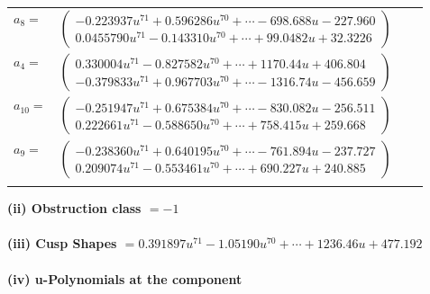 \documentclass[1p]{elsarticle_modified}
\theoremstyle{definition}
\begin{document}
\begin{tabular}{m{7pt} m{180pt} m{7pt} m{180pt} }
\flushright $a_{8}=$&$\begin{pmatrix}-0.223937 u^{71}+0.596286 u^{70}+\cdots-698.688 u-227.960\\0.0455790 u^{71}-0.143310 u^{70}+\cdots+99.0482 u+32.3226\end{pmatrix}$ \\
\flushright $a_{4}=$&$\begin{pmatrix}0.330004 u^{71}-0.827582 u^{70}+\cdots+1170.44 u+406.804\\-0.379833 u^{71}+0.967703 u^{70}+\cdots-1316.74 u-456.659\end{pmatrix}$ \\
\flushright $a_{10}=$&$\begin{pmatrix}-0.251947 u^{71}+0.675384 u^{70}+\cdots-830.082 u-256.511\\0.222661 u^{71}-0.588650 u^{70}+\cdots+758.415 u+259.668\end{pmatrix}$ \\
\flushright $a_{9}=$&$\begin{pmatrix}-0.238360 u^{71}+0.640195 u^{70}+\cdots-761.894 u-237.727\\0.209074 u^{71}-0.553461 u^{70}+\cdots+690.227 u+240.885\end{pmatrix}$\\&\end{tabular}
\flushleft \textbf{(ii) Obstruction class $= -1$}\\~\\
\flushleft \textbf{(iii) Cusp Shapes $= 0.391897 u^{71}-1.05190 u^{70}+\cdots+1236.46 u+477.192$}\\~\\
\newpage\renewcommand{\arraystretch}{1}
\flushleft \textbf{(iv) u-Polynomials at the component}\newline \\
\end{document}
